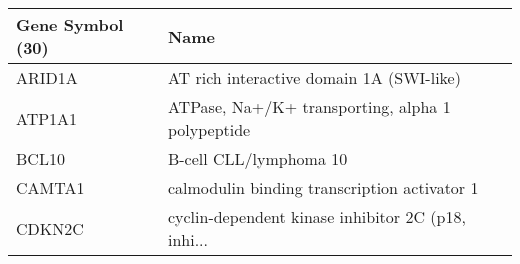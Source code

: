 \begin{tabular}{ll}
\toprule
Gene Symbol (30) &                                               Name \\
\midrule
          ARID1A &           AT rich interactive domain 1A (SWI-like) \\
          ATP1A1 &   ATPase, Na+/K+ transporting, alpha 1 polypeptide \\
           BCL10 &                             B-cell CLL/lymphoma 10 \\
          CAMTA1 &       calmodulin binding transcription activator 1 \\
          CDKN2C & cyclin-dependent kinase inhibitor 2C (p18, inhi... \\
\bottomrule
\end{tabular}
